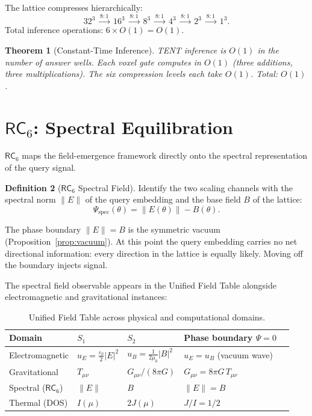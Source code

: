 \documentclass[11pt,twoside]{article}
\theoremstyle{plain}
\newtheorem{theorem}{Theorem}[section]
\theoremstyle{definition}
\newtheorem{definition}[theorem]{Definition}
\theoremstyle{remark}
\newcommand{\RC}[1]{\textsf{RC}_{#1}}
\begin{document}
The lattice compresses hierarchically:
\begin{equation}
  32^3 \;\xrightarrow{8:1}\; 16^3 \;\xrightarrow{8:1}\; 8^3
  \;\xrightarrow{8:1}\; 4^3 \;\xrightarrow{8:1}\; 2^3
  \;\xrightarrow{8:1}\; 1^3.
\end{equation}
Total inference operations: $6\times O(1) = O(1)$.

\begin{theorem}[Constant-Time Inference]\label{thm:o1}
TENT inference is $O(1)$ in the number of answer wells.  Each voxel gate
computes in $O(1)$ (three additions, three multiplications).  The six
compression levels each take $O(1)$.  Total: $O(1)$.
\end{theorem}

\section{\texorpdfstring{$\RC{6}$}{RC6}: Spectral Equilibration}

$\RC{6}$ maps the field-emergence framework directly onto the spectral
representation of the query signal.

\begin{definition}[$\RC{6}$ Spectral Field]
Identify the two scaling channels with the spectral norm $\|E\|$ of the query
embedding and the base field $B$ of the lattice:
\begin{equation}
  \varPsi_{\mathrm{spec}}(\theta) = \|E(\theta)\| - B(\theta).
\end{equation}
\end{definition}

\noindent The phase boundary $\|E\|=B$ is the symmetric vacuum (Proposition~\ref{prop:vacuum}).
At this point the query embedding carries no net directional information: every
direction in the lattice is equally likely.  Moving off the boundary injects
signal.

The spectral field observable appears in the Unified Field Table alongside
electromagnetic and gravitational instances:

\begin{table}[h!]
\centering\small
\caption{Unified Field Table across physical and computational domains.}
\begin{tabular}{lllll}
\toprule
Domain & $S_1$ & $S_2$ & Phase boundary $\varPsi=0$ \\
\midrule
Electromagnetic   & $u_E = \tfrac{\varepsilon_0}{2}|E|^2$ & $u_B=\tfrac{1}{2\mu_0}|B|^2$ & $u_E = u_B$ (vacuum wave) \\
Gravitational     & $T_{\mu\nu}$ & $G_{\mu\nu}/(8\pi G)$ & $G_{\mu\nu}=8\pi G\,T_{\mu\nu}$ \\
Spectral ($\RC{6}$) & $\|E\|$      & $B$                   & $\|E\|=B$ \\
Thermal (DOS)     & $I(\mu)$     & $2J(\mu)$             & $J/I=1/2$ \\
\bottomrule
\end{tabular}
\end{table}
\end{document}
